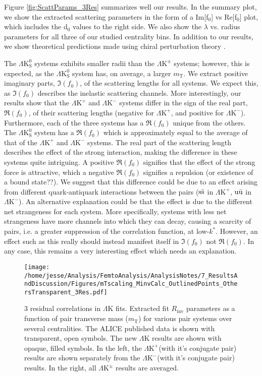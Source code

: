 \documentclass[ALICE,manyauthors]{cernphprep}
\newcommand{\kstar}{$k^{*}$\xspace}
\newcommand{\mt}{$m_{\mathrm{T}}$\xspace}
\newcommand{\LamK}{$\Lambda$K\xspace}
\newcommand{\LamKchP}{$\Lambda\mathrm{K^{+}}$\xspace}
\newcommand{\LamKchM}{$\Lambda\mathrm{K^{-}}$\xspace}
\newcommand{\LamKpm}{$\Lambda\mathrm{K^{\pm}}$\xspace}
\newcommand{\LamKs}{$\Lambda\mathrm{K^{0}_{S}}$\xspace}
\begin{document}
Figure \ref{fig:ScattParams_3Res} summarizes well our results.
In the summary plot, we show the extracted scattering parameters in the form of a Im[f$_{0}$] vs Re[f$_{0}$] plot, which includes the d$_{0}$ values to the right side.  
We also show the $\lambda$ vs. radius parameters for all three of our studied centrality bins. 
In addition to our results, we show theoretical predictions made using chiral perturbation theory \cite{Liu:2006xja,Mai:2009ce}.

The \LamKs systems exhibits smaller radii than the \LamKpm systems; however, this is expected, as the \LamKs system has, on average, a larger \mt.
We extract positive imaginary parts, $\Im(f_{0})$, of the scattering lengths for all systems. 
We expect this, as $\Im(f_{0})$ describes the inelastic scattering channels.
More interestingly, our results show that the \LamKchP and \LamKchM systems differ in the sign of the real part, $\Re(f_{0})$, of their scattering lengths (negative for \LamKchP, and positive for \LamKchM).
Furthermore, each of the three systems has a $\Re(f_{0})$ unique from the others.
The \LamKs system has a $\Re(f_{0})$ which is approximately equal to the average of that of the \LamKchP and \LamKchM systems.
The real part of the scattering length describes the effect of the strong interaction, making the difference in these systems quite intriguing.
A positive $\Re(f_{0})$ signifies that the effect of the strong force is attractive, which a negative $\Re(f_{0})$ signifies a repulsion (or existence of a bound state??).
We suggest that this difference could be due to an effect arising from different quark-antiquark interactions between the pairs ($\rm s\bar{s}$ in \LamKchP, $\rm u\bar{u}$ in \LamKchM).
An alternative explanation could be that the effect is due to the different net strangeness for each system.
More specifically, systems with less net strangeness have more channels into which they can decay, causing a scarcity of pairs, i.e. a greater suppression of the correlation function, at low-\kstar.
However, an effect such as this really should instead manifest itself in $\Im(f_{0})$ not $\Re(f_{0})$.
In any case, this remains a very interesting effect which needs an explanation.


\begin{figure}[h]
  \centering
  \texttt{[image: /home/jesse/Analysis/FemtoAnalysis/AnalysisNotes/7\_ResultsAndDiscussion/Figures/mTscaling\_MinvCalc\_OutlinedPoints\_OthersTransparent\_3Res.pdf]}
  \caption[\mt Scaling of Radii: 3 Residuals in Fit]{3 residual correlations in \LamK fits.  Extracted fit $R_{\mathrm{inv}}$ parameters as a function of pair transverse mass (\mt) for various pair systems over several centralities. The ALICE published data \cite{Adam:2015vja} is shown with transparent, open symbols.  The new \LamK results are shown with opaque, filled symbols.  In the left, the \LamKchP (with it's conjugate pair) results are shown separately from the \LamKchM (with it's conjugate pair) results.  In the right, all \LamKpm results are averaged.}
  \label{fig:mTScalingOfRadii_3Res}
\end{figure}
\end{document}
